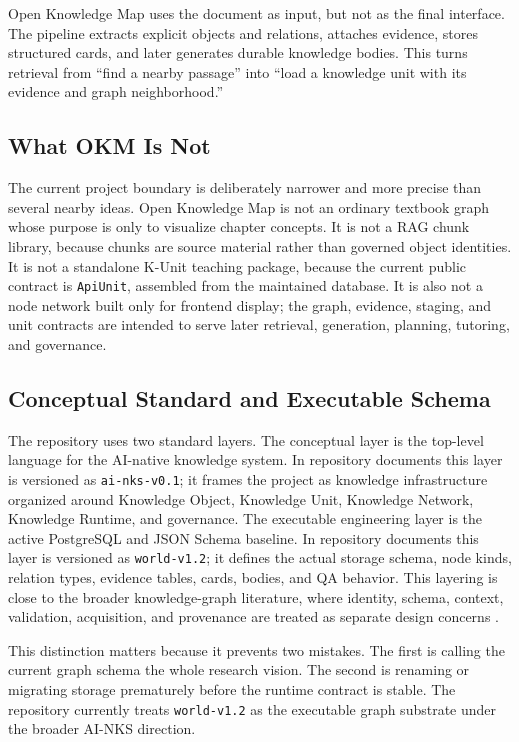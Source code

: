 \documentclass[11pt,letterpaper]{article}
\newcommand{\code}[1]{\nolinkurl{#1}}
\newcommand{\OKM}{Open Knowledge Map}
\newcommand{\AINKS}{AI-NKS}
\begin{document}
\OKM{} uses the document as input, but not as the final interface. The pipeline extracts explicit objects and relations, attaches evidence, stores structured cards, and later generates durable knowledge bodies. This turns retrieval from ``find a nearby passage'' into ``load a knowledge unit with its evidence and graph neighborhood.''

\subsection{What OKM Is Not}

The current project boundary is deliberately narrower and more precise than several nearby ideas. \OKM{} is not an ordinary textbook graph whose purpose is only to visualize chapter concepts. It is not a RAG chunk library, because chunks are source material rather than governed object identities. It is not a standalone K-Unit teaching package, because the current public contract is \code{ApiUnit}, assembled from the maintained database. It is also not a node network built only for frontend display; the graph, evidence, staging, and unit contracts are intended to serve later retrieval, generation, planning, tutoring, and governance.

\subsection{Conceptual Standard and Executable Schema}

The repository uses two standard layers. The conceptual layer is the top-level language for the AI-native knowledge system. In repository documents this layer is versioned as \code{ai-nks-v0.1}; it frames the project as knowledge infrastructure organized around Knowledge Object, Knowledge Unit, Knowledge Network, Knowledge Runtime, and governance. The executable engineering layer is the active PostgreSQL and JSON Schema baseline. In repository documents this layer is versioned as \code{world-v1.2}; it defines the actual storage schema, node kinds, relation types, evidence tables, cards, bodies, and QA behavior. This layering is close to the broader knowledge-graph literature, where identity, schema, context, validation, acquisition, and provenance are treated as separate design concerns \cite{hogan-kg,ji-kg-survey,rdf,owl,shacl,prov}.

This distinction matters because it prevents two mistakes. The first is calling the current graph schema the whole research vision. The second is renaming or migrating storage prematurely before the runtime contract is stable. The repository currently treats \code{world-v1.2} as the executable graph substrate under the broader \AINKS{} direction.
\end{document}
